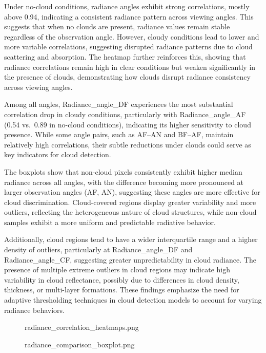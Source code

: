 \documentclass[11pt]{article}
\begin{document}
    Under no-cloud conditions, radiance angles exhibit strong correlations,
mostly above 0.94, indicating a consistent radiance pattern across
viewing angles. This suggests that when no clouds are present, radiance
values remain stable regardless of the observation angle. However,
cloudy conditions lead to lower and more variable correlations,
suggesting disrupted radiance patterns due to cloud scattering and
absorption. The heatmap further reinforces this, showing that radiance
correlations remain high in clear conditions but weaken significantly in
the presence of clouds, demonstrating how clouds disrupt radiance
consistency across viewing angles.

Among all angles, Radiance\_angle\_DF experiences the most substantial
correlation drop in cloudy conditions, particularly with
Radiance\_angle\_AF (0.54 vs.~0.89 in no-cloud conditions), indicating
its higher sensitivity to cloud presence. While some angle pairs, such
as AF--AN and BF--AF, maintain relatively high correlations, their
subtle reductions under clouds could serve as key indicators for cloud
detection.

The boxplots show that non-cloud pixels consistently exhibit higher
median radiance across all angles, with the difference becoming more
pronounced at larger observation angles (AF, AN), suggesting these
angles are more effective for cloud discrimination. Cloud-covered
regions display greater variability and more outliers, reflecting the
heterogeneous nature of cloud structures, while non-cloud samples
exhibit a more uniform and predictable radiative behavior.

Additionally, cloud regions tend to have a wider interquartile range and
a higher density of outliers, particularly at Radiance\_angle\_DF and
Radiance\_angle\_CF, suggesting greater unpredictability in cloud
radiance. The presence of multiple extreme outliers in cloud regions may
indicate high variability in cloud reflectance, possibly due to
differences in cloud density, thickness, or multi-layer formations.
These findings emphasize the need for adaptive thresholding techniques
in cloud detection models to account for varying radiance behaviors.

\begin{figure}
\centering
{}
\caption{radiance\_correlation\_heatmaps.png}
\end{figure}

\begin{figure}
\centering
{}
\caption{radiance\_comparison\_boxplot.png}
\end{figure}
\end{document}
